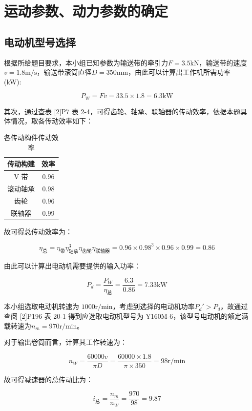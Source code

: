 \documentclass[12pt]{ctexart}
\begin{document}
\newpage

\section{运动参数、动力参数的确定}

\subsection{电动机型号选择}

根据所给题目要求，本小组已知参数为输送带的牵引力$F=3.5\text{kN}$，输送带的速度$v=1.8\text{m/s}$，输送带滚筒直径$D=350\text{mm}$，由此可以计算出工作机所需功率 (kW):

$$P_W=Fv=33.5\times 1.8=6.3\text{kW}$$

其次，通过查表 [2]P7 表 2-4，可得齿轮、轴承、联轴器的传动效率，依据本题具体情况，取各传动效率如下：

\begin{table}[h]
    \centering
    \begin{tabular}{c c}
        \toprule
        传动构建 & 效率 \\
        \midrule
        V 带 & 0.96\\
        滚动轴承 & 0.98\\
        齿轮 & 0.96\\
        联轴器 & 0.99\\
        \bottomrule
    \end{tabular}
    \caption{各传动构件传动效率}
\end{table}

故可得总传动效率为：

$$\eta_\text{总} = \eta_\text{带}\eta^3_{\text{轴承}}\eta_{\text{齿轮}}\eta_{\text{联轴器}}=0.96\times 0.98^3\times 0.96\times 0.99 = 0.86$$

由此可以计算出电动机需要提供的输入功率：

$$P_d = \frac{P_W}{\eta_\text{总}} = \frac{6.3}{0.86} = 7.33\text{kW}$$

本小组选取电动机转速为 $1000\text{r/min}$，考虑到选择的电动机功率$P_d'>P_d$，故通过查阅 [2]P196 表 20-1 得到应选取电动机型号为 Y160M-6，该型号电动机的额定满载转速为$n_m=970\text{r/min}$。

对于输出卷筒而言，计算其工作转速为：

$$n_W = \frac{60000v}{\pi D} = \frac{60000\times 1.8}{\pi \times 350} = 98\text{r/min}$$

故可得减速器的总传动比为：

$$i_\text{总} = \frac{n_m}{n_W}=\frac{970}{98}=9.87$$
\end{document}
